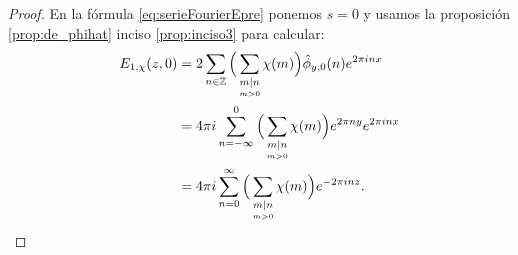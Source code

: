 \documentclass[../../tesis_maestria]{subfiles}
\begin{document}
\begin{proof}
  En la f\'ormula \eqref{eq:serieFourierEpre} ponemos $s=0$ y usamos la proposici\'on
  \ref{prop:de_phihat} inciso \ref{prop:inciso3} para calcular:
  \begin{align*}
    E_{1,\chi}(z,0)
    &=2\sum_{n\in\mathbb{Z}}\Big(\sum_{\underset{m>0}{m\mid n}}\chi(m)\Big)\hat{\phi}_{y,0}(n)e^{2\pi inx}\\
    &=4\pi i\sum_{n=-\infty}^{0}\Big(\sum_{\underset{m>0}{m\mid n}}\chi(m)\Big)e^{2\pi ny}e^{2\pi inx}\\
    &= 4\pi i\sum_{n=0}^{\infty}\Big(\sum_{\underset{m>0}{m\mid n}}\chi(m)\Big)e^{-2\pi inz}.
  \end{align*}
  


  

\end{proof}
\end{document}
